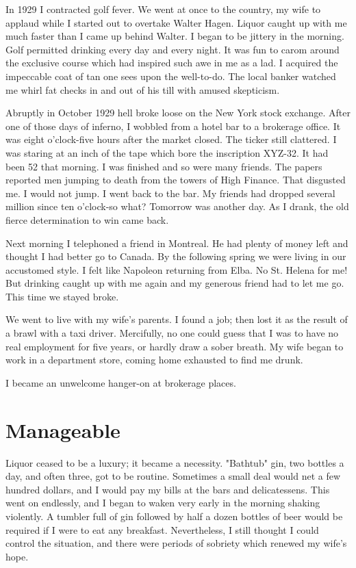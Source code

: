 In 1929 I contracted golf fever.
We went at once to the country, my wife to applaud while I started out to overtake Walter Hagen.
Liquor caught up with me much faster than I came up behind Walter.
I began to be jittery in the morning.
Golf permitted drinking every day and every night.
It was fun to carom around the exclusive course which had inspired such awe in me as a lad.
I acquired the impeccable coat of tan one sees upon the well-to-do.
The local banker watched me whirl fat checks in and out of his till with amused skepticism.

Abruptly in October 1929 hell broke loose on the New York stock exchange.
After one of those days of inferno, I wobbled from a hotel bar to a brokerage office.
It was eight o'clock-five hours after the market closed.
The ticker still clattered.
I was staring at an inch of the tape which bore the inscription XYZ-32.
It had been 52 that morning.
I was finished and so were many friends.
The papers reported men jumping to death from the towers of High Finance.
That disgusted me.
I would not jump.
I went back to the bar.
My friends had dropped several million since ten o'clock-so what?
Tomorrow was another day.
As I drank, the old fierce determination to win came back.

Next morning I telephoned a friend in Montreal.
He had plenty of money left and thought I had better go to Canada.
By the following spring we were living in our accustomed style.
I felt like Napoleon returning from Elba.
No St. Helena for me!
But drinking caught up with me again and my generous friend had to let me go.
This time we stayed broke.

We went to live with my wife's parents.
I found a job; then lost it as the result of a brawl with a taxi driver.
Mercifully, no one could guess that I was to have no real employment for five years, or hardly draw a sober breath.
My wife began to work in a department store, coming home exhausted to find me drunk.

I became an unwelcome hanger-on at brokerage places.


\section{Manageable}

Liquor ceased to be a luxury; it became a necessity.
"Bathtub" gin, two bottles a day, and often three, got to be routine.
Sometimes a small deal would net a few hundred dollars, and I would pay my bills at the bars and delicatessens.
This went on endlessly, and I began to waken very early in the morning shaking violently.
A tumbler full of gin followed by half a dozen bottles of beer would be required if I were to eat any breakfast.
Nevertheless, I still thought I could control the situation, and there were periods of sobriety which renewed my wife's hope.

